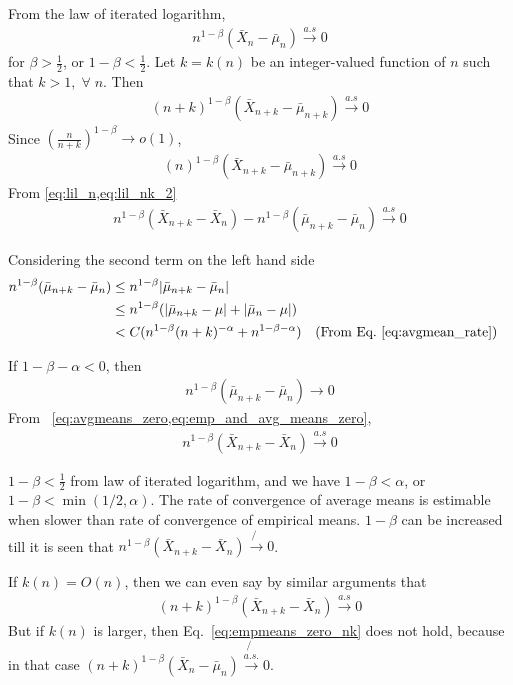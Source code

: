 \documentclass[a4paper, 11pt]{article}
\newcommand{\empmean}{\bar{X}_n}
\newcommand{\avgmean}{\bar{\mu}_n}
\newcommand{\empmeank}{\bar{X}_{n+k}}
\newcommand{\avgmeank}{\bar{\mu}_{n+k}}
\begin{document}
From the law of iterated logarithm,
\begin{align} \label{eq:lil_n}
  n^{1-\beta}(\empmean-\avgmean) \xrightarrow{a.s} 0
\end{align}
for $\beta > \frac{1}{2}$, or $1-\beta < \frac{1}{2}$. Let $k = k(n)$ be an
integer-valued function of $n$ such that $k > 1,\; \forall\; n$. Then 
\begin{align}
  (n+k)^{1-\beta}(\empmeank-\avgmeank) \xrightarrow{a.s} 0
\end{align}
Since $\left(\frac{n}{n+k}\right)^{1-\beta} \rightarrow o(1)$, 
\begin{align} \label{eq:lil_nk_2}
  (n)^{1-\beta}(\empmeank-\avgmeank) \xrightarrow{a.s} 0 
\end{align}
From \cref{eq:lil_n,eq:lil_nk_2}
\begin{align} \label{eq:emp_and_avg_means_zero}
  n^{1-\beta}(\empmeank-\empmean)-n^{1-\beta}(\avgmeank-\avgmean)
  \xrightarrow{a.s} 0
\end{align}

Considering the second term on the left hand side
\begin{align}
  n^{1-\beta}(\avgmeank-\avgmean) &\leq n^{1-\beta}|\avgmeank-\avgmean| \nonumber
  \\
  &\leq n^{1-\beta}(|\avgmeank-\mu|+|\avgmean-\mu|) \nonumber \\
  &< C(n^{1-\beta}(n+k)^{-\alpha}+n^{1-\beta-\alpha}) \nonumber &&\text{(From Eq.~\ref{eq:avgmean_rate})}
\end{align}

If $1-\beta-\alpha < 0$, then 
\begin{align} \label{eq:avgmeans_zero}
  n^{1-\beta}(\avgmeank-\avgmean) \rightarrow 0 
\end{align}
From ~\cref{eq:avgmeans_zero,eq:emp_and_avg_means_zero},
\begin{align} \label{eq:empmeans_zero}
  n^{1-\beta}(\empmeank-\empmean) \xrightarrow{a.s} 0
\end{align}

$1-\beta < \frac{1}{2}$ from law of iterated logarithm, and we have $1-\beta <
\alpha$, or $1-\beta < \min(1/2,\alpha)$. The rate of convergence of average
means is estimable when slower than rate of convergence of empirical
means. $1-\beta$ can be increased till it is seen that
$n^{1-\beta}(\empmeank-\empmean) \not{\rightarrow} 0$. 

If $k(n) = O(n)$, then we can even say by similar arguments that
\begin{align} \label{eq:empmeans_zero_nk}
  (n+k)^{1-\beta}(\empmeank-\empmean) \xrightarrow{a.s} 0
\end{align}
But if $k(n)$ is larger, then Eq.~\ref{eq:empmeans_zero_nk} does not hold, because
in that case $(n+k)^{1-\beta}(\empmean-\avgmean) \not{\xrightarrow{a.s.}} 0$.
\end{document}
